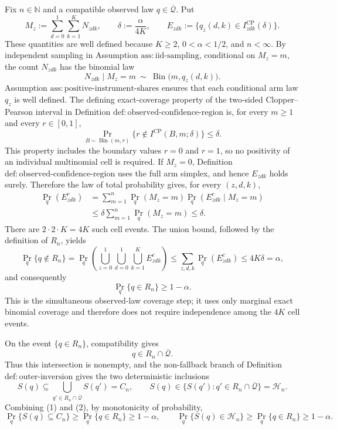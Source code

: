 Fix \(n\in\mathbb N\) and a compatible observed law \(q\in\overline{\mathcal Q}\).  Put
\[
M_z:=\sum_{d=0}^1\sum_{k=1}^K N_{zdk},
\qquad
\delta:=\frac{\alpha}{4K},
\qquad
E_{zdk}:=\{q_z(d,k)\in I^{\mathrm{CP}}_{zdk}(\delta)\}.
\]
These quantities are well defined because \(K\ge2\), \(0<\alpha<1/2\), and \(n<\infty\).  By independent sampling in Assumption \(\mathrm{ass:iid\text{-}sampling}\), conditional on \(M_z=m\), the count \(N_{zdk}\) has the binomial law
\[
N_{zdk}\mid M_z=m\ \sim\ \operatorname{Bin}\bigl(m,q_z(d,k)\bigr).
\]
Assumption \(\mathrm{ass:positive\text{-}instrument\text{-}shares}\) ensures that each conditional arm law \(q_z\) is well defined.  The defining exact-coverage property of the two-sided Clopper--Pearson interval in Definition \(\mathrm{def:observed\text{-}confidence\text{-}region}\) is, for every \(m\ge1\) and every \(r\in[0,1]\),
\[
\Pr_{B\sim\operatorname{Bin}(m,r)}
 \{r\notin I^{\mathrm{CP}}(B,m;\delta)\}\le\delta.
\]
This property includes the boundary values \(r=0\) and \(r=1\), so no positivity of an individual multinomial cell is required.  If \(M_z=0\), Definition \(\mathrm{def:observed\text{-}confidence\text{-}region}\) uses the full arm simplex, and hence \(E_{zdk}\) holds surely.  Therefore the law of total probability gives, for every \((z,d,k)\),
\[
\begin{aligned}
\Pr_q(E_{zdk}^{c})
&=\sum_{m=1}^{n}\Pr_q(M_z=m)
  \Pr_q(E_{zdk}^{c}\mid M_z=m)\\
&\le \delta\sum_{m=1}^{n}\Pr_q(M_z=m)
\le\delta.
\end{aligned}
\]
There are \(2\cdot2\cdot K=4K\) such cell events.  The union bound, followed by the definition of \(R_n\), yields
\[
\Pr_q\{q\notin R_n\}
 =\Pr_q\!\left(\bigcup_{z=0}^1\bigcup_{d=0}^1
                    \bigcup_{k=1}^K E_{zdk}^{c}\right)
 \le\sum_{z,d,k}\Pr_q(E_{zdk}^{c})
 \le4K\delta=\alpha,
\]
and consequently
\[
\Pr_q\{q\in R_n\}\ge1-\alpha. \tag{1}
\]
This is the simultaneous observed-law coverage step; it uses only marginal exact binomial coverage and therefore does not require independence among the \(4K\) cell events.

On the event \(\{q\in R_n\}\), compatibility gives
\[
q\in R_n\cap\overline{\mathcal Q}.
\]
Thus this intersection is nonempty, and the non-fallback branch of Definition \(\mathrm{def:outer\text{-}inversion}\) gives the two deterministic inclusions
\[
S(q)\subseteq
 \bigcup_{q'\in R_n\cap\overline{\mathcal Q}}S(q')=C_n,
\qquad
S(q)\in
 \{S(q'):q'\in R_n\cap\overline{\mathcal Q}\}=\mathcal H_n. \tag{2}
\]
Combining (1) and (2), by monotonicity of probability,
\[
\Pr_q\{S(q)\subseteq C_n\}
 \ge\Pr_q\{q\in R_n\}\ge1-\alpha,
\qquad
\Pr_q\{S(q)\in\mathcal H_n\}
 \ge\Pr_q\{q\in R_n\}\ge1-\alpha.
\]


